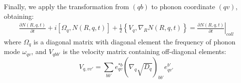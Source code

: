 \documentclass{article}
\begin{document}
Finally, we apply the transformation from $(qb)$ to phonon coordinate $(qv)$, obtaining:
\begin{align}
    \frac{\partial N(R,q,t)}{\partial t} + i \left[ \Omega_{q},N(R,q,t) \right] + 
        \frac{1}{2} \left\{ V_{q}, \nabla_R N(R,q,t) \right\} 
        = \left. \frac{\partial N(R,q,t) }{\partial t} \right|_{coll} \label{derived3}
\end{align}
where $\Omega_q$ is a diagonal matrix with diagonal element the frequency of phonon mode $\omega_{qv}$, and $V_{qbb'}$ is 
the velocity matrix containing off-diagonal elements:
\begin{equation}
    V_{q,vv'} = \sum_{bb'} e^{*b}_{qv} ( \nabla_q\sqrt{D_q})_{bb'} e^{b'}_{qv'}
\end{equation}
\end{document}
